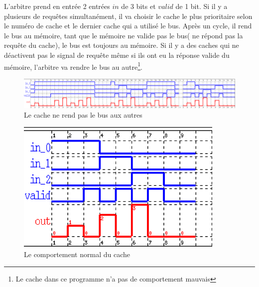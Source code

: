 \documentclass[a4paper,11pt]{report}
\begin{document}
	L'arbitre prend en entrée 2 entrées $in$ de 3 bits et $valid$ de 1 bit. Si il y a plusieurs de requêtes simultanément, il va choisir le cache le plus prioritaire selon le numéro de cache et le dernier cache qui a utilisé le bus. Après un cycle, il rend le bus au mémoire, tant que le mémoire ne valide pas le bus( ne répond pas la requête du cache), le bus est toujours au mémoire. Si il y a des caches qui ne déactivent pas le signal de requête même si ils ont eu la réponse valide du mémoire, l'arbitre va rendre le bus au autre\footnote{Le cache dans ce programme n'a pas de comportement mauvais}.	
	
	\begin{figure}[!htbp]
		
		\includegraphics[width = 16cm]{arb_diag_1.png}
		\caption{Le cache ne rend pas le bus aux autres}
	\end{figure}
	\begin{figure}[!htbp]
		\centering
		\includegraphics[width = 10cm]{arb_diag_2.png}
		\caption{Le comportement normal du cache}
	\end{figure}
	
\end{document}

